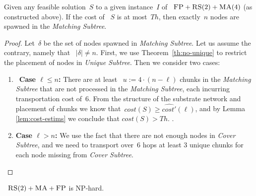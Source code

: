 \documentclass[preprint,12pt]{elsarticle}
\newcommand{\FP}{\textsc{FP}}
\newcommand{\RS}{\textsc{RS}}
\newcommand{\MA}{\textsc{MA}}
\newcommand{\Solution}{S}
\newcommand{\CostSol}{\textit{cost}(\Solution)}
\newcommand{\CostEstimTwo}{\widehat{cost'}}
\newcommand{\UnqSubtree}{{{\emph{Unique Subtree}}}}
\newcommand{\MatchSubtree}{{\emph{Matching Subtree}}}
\newcommand{\CoverSubtree}{{\emph{Cover Subtree}}}
\newcommand{\SpawnedMatchSubtree}{\delta}
\newcommand{\Thr}{\ensuremath{Th}}
\begin{document}
\begin{lemma}
  Given any feasible solution~$\Solution$ to a given instance~$I$ of
 ~$\FP+\RS(2)+\MA(4)$ (as constructed above). If the cost of
 ~$\Solution$ is at most~$\Thr$, then exactly~$n$ nodes are spawned in the
  \MatchSubtree.
  \label{th:np-balance}
\end{lemma}
\begin{proof}
  Let~$\SpawnedMatchSubtree$ be the set of nodes spawned in
  {\MatchSubtree}.  Let us assume the contrary, namely that
 ~$|\SpawnedMatchSubtree| \neq n$.  First, we use
  Theorem~\ref{th:no-unique} to restrict the placement of nodes in
  \UnqSubtree. Then we consider two cases:
  \begin{enumerate}
    
    \item~\textbf{Case $\ell \leq n$:} There are at least
   ~$u := 4 \cdot (n-\ell)$ chunks in the {\MatchSubtree} that are not
    processed in the {\MatchSubtree}, each incurring transportation
    cost of~$6$.
     From the structure of the substrate network and placement of
    chunks we know that~$\CostSol \geq \CostEstimTwo(\ell)$, and by Lemma \ref{lem:cost-estims}
  we conclude that $\CostSol > \Thr$.
.

    \item \textbf{Case $\ell>n$:} We use the fact that there are not enough nodes in
    {\CoverSubtree}, and we need to transport over~$6$ hops at least 3
    unique chunks for each node missing from {\CoverSubtree}.
  \end{enumerate}
\end{proof}

\begin{theorem}
 ~$\RS(2)+\MA+\FP$ is NP-hard.
\end{theorem}
\end{document}
